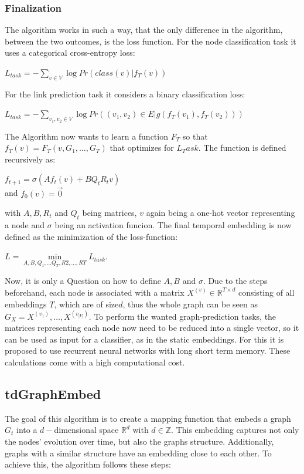 \documentclass[sigconf]{acmart}
\begin{document}
\subsubsection{Finalization}
The algorithm works in such a way, that the only difference in the algorithm, between the two outcomes, is the loss function. 
For the node classification task it uses a categorical cross-entropy loss:
\begin{center}
 \(L_{task} = -\sum\limits_{v\in V} \log {Pr(class(v)|f_T(v))}\)
\end{center}
For the link prediction task it considers a binary classification loss: 
\begin{center}
  \(L_{task} = -\sum\limits_{v_1, v_2 \in V} \log{Pr((v_1,v_2)\in E | g(f_T(v_1), f_T(v_2)))}\)
\end{center}
The Algorithm now wants to learn a function \(F_T\) so that \(f_T(v) = F_T(v,G_1, \ldots, G_T)\) that optimizes for \(L_Task\).
The function is defined recursively as: 
\begin{center}
  \(f_{t+1} = \sigma(Af_t(v) + BQ_tR_tv)\) \\
  and \(f_0(v) = \vec{0}\)
\end{center}
with \(A,B,R_t\) and \(Q_t\) being matrices, \(v\) again being a one-hot vector representing a node and \(\sigma\) being an activation funcion.
The final temporal embedding is now defined as the minimization of the loss-function:
\begin{center}
  \( L = \min\limits_{A,B,Q_1, \ldots Q_T,R2, \ldots, RT} L_{task}\).
\end{center}
Now, it is only a Question on how to define \(A,B\) and \(\sigma\).
Due to the steps beforehand, each node is associated with a matrix \(X^{(v)} \in \mathbb{R}^{T \times d}\) consisting of 
all embeddings \(T\), which are of size\(d\), thus the whole graph can be seen as \(G_X = X^{(v_1)},\ldots, X^{(v_{|V|})}\).
To perform the wanted graph-prediction tasks, the matrices representing each node now need to be reduced into a single vector, so it can be used as input for a classifier, as in the static embeddings.
For this it is proposed to use recurrent neural networks with long short term memory. These calculations come with a high computational cost.
\cite{Singer.2019}

\subsection{tdGraphEmbed}
The goal of this algorithm is to create a mapping function that embeds a graph \(G_t\) into a \(d-\)dimensional space \(\mathbb{R}^d\) with \(d \in \mathbb{Z}\).
This embedding captures not only the nodes' evolution over time, but also the graphs structure. Additionally, graphs with a similar structure have an embedding close to each other.
To achieve this, the algorithm follows these steps:
\end{document}
